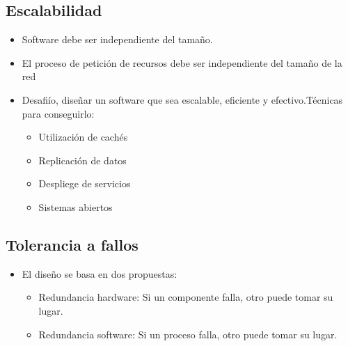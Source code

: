 \subsection{Escalabilidad}
\begin{itemize}
    \item Software debe ser independiente del tamaño.
    \item El proceso de petición de recursos debe ser independiente del tamaño de la red
    \item Desafiío, diseñar un software que sea escalable, eficiente y efectivo.Técnicas para conseguirlo:
    \begin{itemize}
        \item Utilización de cachés
        \item Replicación de datos
        \item Despliege de servicios
        \item Sistemas abiertos
    \end{itemize}
\end{itemize}

\subsection{Tolerancia a fallos}
\begin{itemize}
    \item El diseño se basa en dos propuestas:
    \begin{itemize}
        \item Redundancia hardware: Si un componente falla, otro puede tomar su lugar.
        \item Redundancia software: Si un proceso falla, otro puede tomar su lugar.
\end{itemize}
\end{itemize}

